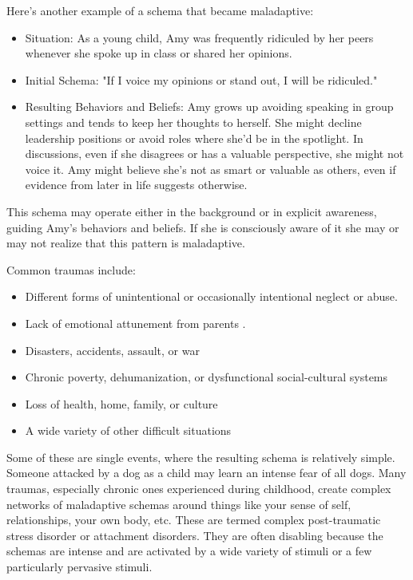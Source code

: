 \documentclass[12pt,letterpaper]{book}
\begin{document}
Here's another example of a schema that became maladaptive:
\begin{itemize}
    \item Situation: As a young child, Amy was frequently ridiculed by her peers whenever she spoke up in class or shared her opinions.
    \item Initial Schema: "If I voice my opinions or stand out, I will be ridiculed."
    \item Resulting Behaviors and Beliefs: Amy grows up avoiding speaking in group settings and tends to keep her thoughts to herself. She might decline leadership positions or avoid roles where she'd be in the spotlight. In discussions, even if she disagrees or has a valuable perspective, she might not voice it. Amy might believe she's not as smart or valuable as others, even if evidence from later in life suggests otherwise.
\end{itemize}
This schema may operate either in the background or in explicit awareness, guiding Amy's behaviors and beliefs. If she is consciously aware of it she may or may not realize that this pattern is maladaptive.

Common traumas include:
\begin{itemize}
    \item Different forms of unintentional or occasionally intentional neglect or abuse.
    \item Lack of emotional attunement from parents \cite{brownAttachmentDisturbances}.
    \item Disasters, accidents, assault, or war
    \item Chronic poverty, dehumanization, or dysfunctional social-cultural systems \cite{roncaStructuralViolence}
    \item Loss of health, home, family, or culture
    \item A wide variety of other difficult situations
\end{itemize}
Some of these are single events, where the resulting schema is relatively simple. Someone attacked by a dog as a child may learn an intense fear of all dogs. Many traumas, especially chronic ones experienced during childhood, create complex networks of maladaptive schemas around things like your sense of self, relationships, your own body, etc. These are termed complex post-traumatic stress disorder or attachment disorders. They are often disabling because the schemas are intense and are activated by a wide variety of stimuli or a few particularly pervasive stimuli.
\end{document}

